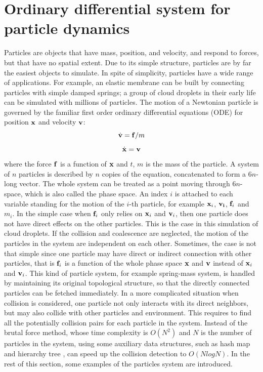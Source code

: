 \section{Ordinary differential system for particle dynamics}
Particles are objects that have mass, position, and velocity, and respond to forces, but that have no spatial extent. Due to its simple structure, particles are by far the easiest objects to simulate. In spite of simplicity, particles have a wide range of applications. For example, an elastic membrane can be built by connecting particles with simple damped springs; a group of cloud droplets in their early life can be simulated with millions of particles. The motion of a Newtonian particle is governed by the familiar first order ordinary differential equations (ODE) for position $\mathbf{x}$ and velocity $\mathbf{v}$:
\begin{equation}
\dot{\mathbf{v}} = \mathbf{f}/m
\label{dv_eqn}
\end{equation}
\begin{equation}
\dot{\mathbf{x}} = \mathbf{v}
\label{dx_eqn}
\end{equation}
where the force $\mathbf{f}$ is a function of $\mathbf{x}$ and $t$, $m$ is the mass of the particle. A system of $n$ particles is described by $n$ copies of the equation, concatenated to form a $6n$-long vector. The whole system can be treated as a point moving through $6n$-space, which is also called the phase space. An index $i$ is attached to each variable standing for the motion of the $i$-th particle, for example $\mathbf{x}_i$, $\mathbf{v_i}$, $\mathbf{f}_i$ and $m_i$. In the simple case when $\mathbf{f}_i$ only relies on $\mathbf{x}_i$ and $\mathbf{v}_i$, then one particle does not have direct effects on the other particles. This is the case in this simulation of cloud droplets. If the collision and coalescence are neglected, the motion of the particles in the system are independent on each other. Sometimes, the case is not that simple since one particle may have direct or indirect connection with other particles, that is $\mathbf{f}_i$ is a function of the whole phase space $\mathbf{x}$ and $\mathbf{v}$ instead of $\mathbf{x}_i$ and $\mathbf{v}_i$. This kind of particle system, for example spring-mass system, is handled by maintaining its original topological structure, so that the directly connected particles can be fetched immediately. In a more complicated situation when collision is considered, one particle not only interacts with its direct neighbors, but may also collide with other particles and environment. This requires to find all the potentially collision pairs for each particle in the system. Instead of the brutal force method, whose time complexity is $O(N^2)$ and $N$ is the number of particles in the system, using some auxiliary data structures, such as hash map \cite{TeschnerCollision2005} and hierarchy tree \cite{VolinoEfficient1994,BridsonRobust2002}, can speed up the collision detection to $O(NlogN)$. In the rest of this section, some examples of the particles system are introduced.

